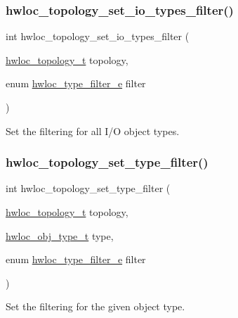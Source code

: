 \subsubsection{\texorpdfstring{hwloc\+\_\+topology\+\_\+set\+\_\+io\+\_\+types\+\_\+filter()}{hwloc\_topology\_set\_io\_types\_filter()}}
{\footnotesize\ttfamily int hwloc\+\_\+topology\+\_\+set\+\_\+io\+\_\+types\+\_\+filter (\begin{DoxyParamCaption}\item[{\hyperlink{a00186_ga9d1e76ee15a7dee158b786c30b6a6e38}{hwloc\+\_\+topology\+\_\+t}}]{topology,  }\item[{enum \hyperlink{a00193_ga9a5a1f0140cd1952544477833733195b}{hwloc\+\_\+type\+\_\+filter\+\_\+e}}]{filter }\end{DoxyParamCaption})}



Set the filtering for all I/O object types. 

\mbox{\label{a00193_gad894e70f15f8d4aada7be8d1aba38b7e}} 
\subsubsection{\texorpdfstring{hwloc\+\_\+topology\+\_\+set\+\_\+type\+\_\+filter()}{hwloc\_topology\_set\_type\_filter()}}
{\footnotesize\ttfamily int hwloc\+\_\+topology\+\_\+set\+\_\+type\+\_\+filter (\begin{DoxyParamCaption}\item[{\hyperlink{a00186_ga9d1e76ee15a7dee158b786c30b6a6e38}{hwloc\+\_\+topology\+\_\+t}}]{topology,  }\item[{\hyperlink{a00184_gacd37bb612667dc437d66bfb175a8dc55}{hwloc\+\_\+obj\+\_\+type\+\_\+t}}]{type,  }\item[{enum \hyperlink{a00193_ga9a5a1f0140cd1952544477833733195b}{hwloc\+\_\+type\+\_\+filter\+\_\+e}}]{filter }\end{DoxyParamCaption})}



Set the filtering for the given object type. 

\mbox{\label{a00193_ga2cc7b7b155cba58dda203e54f1637b9c}} 
